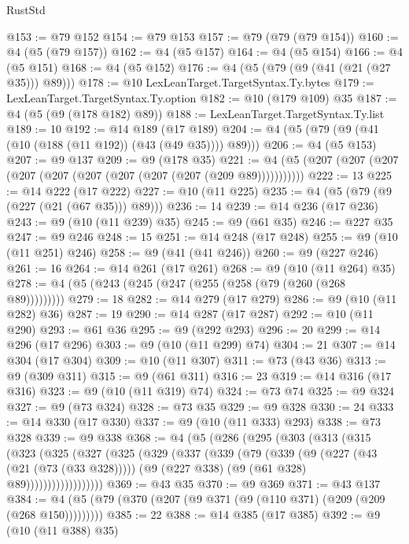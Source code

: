 \begin{lexlean}{RustStd}
\begin{coremodule}
{\begin{coremodule}
{{{{{{{{{{@153 := @79 @152
@154 := @79 @153
@157 := @79 (@79 (@79 @154))
@160 := @4 (@5 (@79 @157))
@162 := @4 (@5 @157)
@164 := @4 (@5 @154)
@166 := @4 (@5 @151)
@168 := @4 (@5 @152)
@176 := @4 (@5 (@79 (@9 (@41 (@21 (@27 @35))) @89)))
@178 := @10 LexLeanTarget.TargetSyntax.Ty.bytes
@179 := LexLeanTarget.TargetSyntax.Ty.option
@182 := @10 (@179 @109) @35
@187 := @4 (@5 (@9 (@178 @182) @89))
@188 := LexLeanTarget.TargetSyntax.Ty.list
@189 := 10
@192 := @14 @189 (@17 @189)
@204 := @4 (@5 (@79 (@9 (@41 (@10 (@188 (@11 @192)) (@43 (@49 @35)))) @89)))
@206 := @4 (@5 @153)
@207 := @9 @137
@209 := @9 (@178 @35)
@221 := @4 (@5 (@207 (@207 (@207 (@207 (@207 (@207 (@207 (@207 (@207 (@209 @89)))))))))))
@222 := 13
@225 := @14 @222 (@17 @222)
@227 := @10 (@11 @225)
@235 := @4 (@5 (@79 (@9 (@227 (@21 (@67 @35))) @89)))
@236 := 14
@239 := @14 @236 (@17 @236)
@243 := @9 (@10 (@11 @239) @35)
@245 := @9 (@61 @35)
@246 := @227 @35
@247 := @9 @246
@248 := 15
@251 := @14 @248 (@17 @248)
@255 := @9 (@10 (@11 @251) @246)
@258 := @9 (@41 (@41 @246))
@260 := @9 (@227 @246)
@261 := 16
@264 := @14 @261 (@17 @261)
@268 := @9 (@10 (@11 @264) @35)
@278 := @4 (@5 (@243 (@245 (@247 (@255 (@258 (@79 (@260 (@268 @89)))))))))
@279 := 18
@282 := @14 @279 (@17 @279)
@286 := @9 (@10 (@11 @282) @36)
@287 := 19
@290 := @14 @287 (@17 @287)
@292 := @10 (@11 @290)
@293 := @61 @36
@295 := @9 (@292 @293)
@296 := 20
@299 := @14 @296 (@17 @296)
@303 := @9 (@10 (@11 @299) @74)
@304 := 21
@307 := @14 @304 (@17 @304)
@309 := @10 (@11 @307)
@311 := @73 (@43 @36)
@313 := @9 (@309 @311)
@315 := @9 (@61 @311)
@316 := 23
@319 := @14 @316 (@17 @316)
@323 := @9 (@10 (@11 @319) @74)
@324 := @73 @74
@325 := @9 @324
@327 := @9 (@73 @324)
@328 := @73 @35
@329 := @9 @328
@330 := 24
@333 := @14 @330 (@17 @330)
@337 := @9 (@10 (@11 @333) @293)
@338 := @73 @328
@339 := @9 @338
@368 := @4
    (@5
      (@286
        (@295
          (@303
            (@313
              (@315
                (@323
                  (@325
                    (@327
                      (@325
                        (@329
                          (@337
                            (@339
                              (@79
                                (@339
                                  (@9
                                    (@227 (@43 (@21 (@73 (@33 @328)))))
                                    (@9 (@227 @338) (@9 (@61 @328) @89))))))))))))))))))
@369 := @43 @35
@370 := @9 @369
@371 := @43 @137
@384 := @4 (@5 (@79 (@370 (@207 (@9 @371 (@9 (@110 @371) (@209 (@209 (@268 @150)))))))))
@385 := 22
@388 := @14 @385 (@17 @385)
@392 := @9 (@10 (@11 @388) @35)
}}}}}}}}}}
\end{coremodule}}
\end{coremodule}
\end{lexlean}
